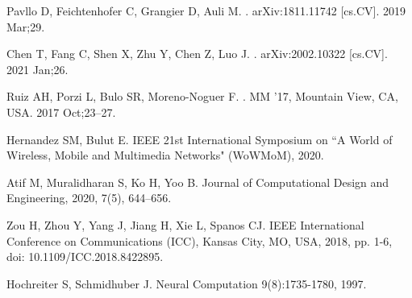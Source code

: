 \documentclass[10pt,letterpaper]{article}
\begin{document}
\begin{thebibliography}{10}
		Pavllo D, Feichtenhofer C, Grangier D, Auli M.
		.
		\newblock arXiv:1811.11742 [cs.CV]. 2019 Mar;29.
		
		Chen T, Fang C, Shen X, Zhu Y, Chen Z, Luo J.
		.
		\newblock arXiv:2002.10322 [cs.CV]. 2021 Jan;26.
		
		Ruiz AH, Porzi L, Bulo SR, Moreno-Noguer F.
		.
		\newblock MM ’17, Mountain View, CA, USA. 2017 Oct;23–27.
		
		
		Hernandez SM, Bulut E.
		\newblock IEEE 21st International Symposium on ``A World of Wireless, Mobile and Multimedia Networks" (WoWMoM), 2020.
		
		Atif M, Muralidharan S, Ko H, Yoo B.
		\newblock Journal of Computational Design and Engineering, 2020, 7(5), 644–656.
		
		Zou H, Zhou Y, Yang J, Jiang H, Xie L, Spanos CJ.
		 IEEE International Conference on Communications (ICC), Kansas City, MO, USA, 2018, pp. 1-6, doi: 10.1109/ICC.2018.8422895.
		
		Hochreiter S, Schmidhuber J.
		\newblock Neural Computation 9(8):1735-1780, 1997.
		
		
		
		
	\end{thebibliography}
	
	
	
\end{document}
